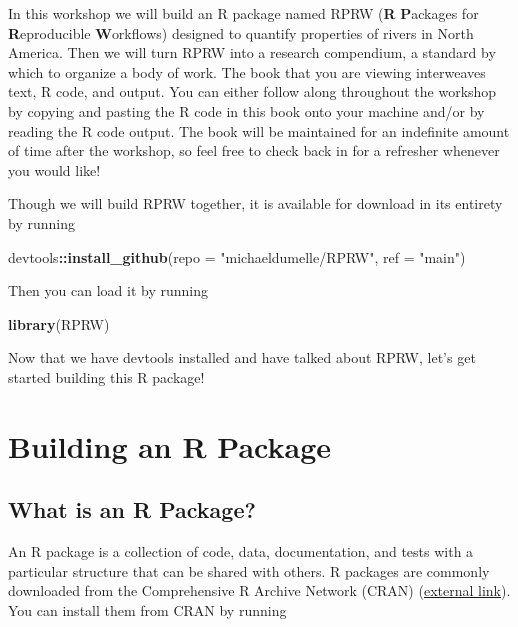 \documentclass[
]{book}
\newenvironment{Shaded}{\begin{snugshade}}{\end{snugshade}}
\newcommand{\DataTypeTok}[1]{\textcolor[rgb]{0.13,0.29,0.53}{#1}}
\newcommand{\KeywordTok}[1]{\textcolor[rgb]{0.13,0.29,0.53}{\textbf{#1}}}
\newcommand{\NormalTok}[1]{#1}
\newcommand{\OperatorTok}[1]{\textcolor[rgb]{0.81,0.36,0.00}{\textbf{#1}}}
\newcommand{\StringTok}[1]{\textcolor[rgb]{0.31,0.60,0.02}{#1}}
\begin{document}
In this workshop we will build an R package named RPRW (\textbf{R} \textbf{P}ackages for \textbf{R}eproducible \textbf{W}orkflows) designed to quantify properties of rivers in North America. Then we will turn RPRW into a research compendium, a standard by which to organize a body of work. The book that you are viewing interweaves text, R code, and output. You can either follow along throughout the workshop by copying and pasting the R code in this book onto your machine and/or by reading the R code output. The book will be maintained for an indefinite amount of time after the workshop, so feel free to check back in for a refresher whenever you would like!

Though we will build RPRW together, it is available for download in its entirety by running

\begin{Shaded}
\begin{Highlighting}[]
\NormalTok{devtools}\OperatorTok{::}\KeywordTok{install_github}\NormalTok{(}\DataTypeTok{repo =} \StringTok{"michaeldumelle/RPRW"}\NormalTok{, }\DataTypeTok{ref =} \StringTok{"main"}\NormalTok{)}
\end{Highlighting}
\end{Shaded}

Then you can load it by running

\begin{Shaded}
\begin{Highlighting}[]
\KeywordTok{library}\NormalTok{(RPRW)}
\end{Highlighting}
\end{Shaded}

Now that we have devtools installed and have talked about RPRW, let's get started building this R package!

\hypertarget{r-package}{%
\chapter{Building an R Package}\label{r-package}}

\hypertarget{what-is-an-r-package}{%
\section{What is an R Package?}\label{what-is-an-r-package}}

An R package is a collection of code, data, documentation, and tests with a particular structure that can be shared with others. R packages are commonly downloaded from the Comprehensive R Archive Network (CRAN) (\href{https://cran.r-project.org/}{external link}). You can install them from CRAN by running
\end{document}

